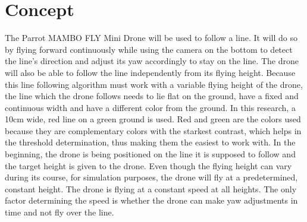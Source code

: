 \documentclass[a4paper, 10pt, conference]{IEEEtran}
\begin{document}
\section{Concept}
The Parrot MAMBO FLY Mini Drone will be used to follow a line. It will do so by flying forward continuously while using the camera on the bottom to detect the line’s direction and adjust its yaw accordingly to stay on the line. The drone will also be able to follow the line independently from its flying height. Because this line following algorithm must work with a variable flying height of the drone, the line which the drone follows needs to lie flat on the ground, have a fixed and continuous width and have a different color from the ground. In this research, a 10cm wide, red line on a green ground is used. Red and green are the colors used because they are complementary colors with the starkest contrast, which helps in the threshold determination, thus making them the easiest to work with.
In the beginning, the drone is being positioned on the line it is supposed to follow and the target height is given to the drone. Even though the flying height can vary during its course, for simulation purposes, the drone will fly at a predetermined, constant height. The drone is flying at a constant speed at all heights. The only factor determining the speed is whether the drone can make yaw adjustments in time and not fly over the line.\\
\end{document}
